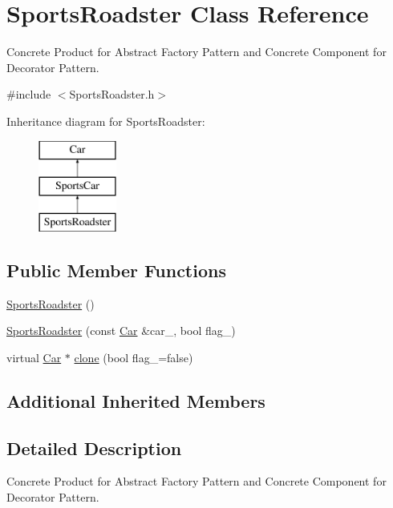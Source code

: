 \hypertarget{class_sports_roadster}{}\section{Sports\+Roadster Class Reference}
\label{class_sports_roadster}


Concrete Product for Abstract Factory Pattern and Concrete Component for Decorator Pattern.  




{\ttfamily \#include $<$Sports\+Roadster.\+h$>$}

Inheritance diagram for Sports\+Roadster\+:\begin{figure}[H]
\begin{center}
\leavevmode
\includegraphics[height=3.000000cm]{class_sports_roadster}
\end{center}
\end{figure}
\subsection*{Public Member Functions}
\begin{DoxyCompactItemize}
\item 
\mbox{\hyperlink{class_sports_roadster_a649c7193525cf0f80f2f0866d8af809d}{Sports\+Roadster}} ()
\item 
\mbox{\hyperlink{class_sports_roadster_af330cc2ea66c502e707322cb4270a63b}{Sports\+Roadster}} (const \mbox{\hyperlink{class_car}{Car}} \&car\+\_\+, bool flag\+\_\+)
\item 
virtual \mbox{\hyperlink{class_car}{Car}} $\ast$ \mbox{\hyperlink{class_sports_roadster_a2f6df8bfdb8a28c413dbd976de77f68a}{clone}} (bool flag\+\_\+=false)
\end{DoxyCompactItemize}
\subsection*{Additional Inherited Members}


\subsection{Detailed Description}
Concrete Product for Abstract Factory Pattern and Concrete Component for Decorator Pattern. 

